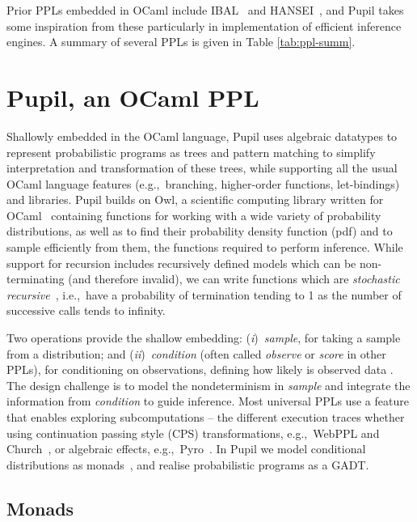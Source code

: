 \documentclass[sigconf]{acmart}
\newcommand{\one}{({\em i})\/}
\newcommand{\two}{({\em ii})\/}
\newcommand{\pupil}{Pupil\xspace}
\begin{document}
Prior PPLs embedded in OCaml include IBAL~\cite{ibal} and HANSEI~\cite{kiselyov2009embedded}, and \pupil takes some inspiration from these particularly in implementation of efficient inference engines. A summary of several PPLs is given in Table \ref{tab:ppl-summ}.

\section{\pupil, an OCaml PPL}
\label{s:pupil}

Shallowly embedded in the OCaml language, \pupil uses algebraic datatypes to represent probabilistic programs as trees and pattern matching to simplify interpretation and transformation of these trees, while supporting all the usual OCaml language features (e.g.,~branching, higher-order functions, let-bindings) and libraries. \pupil builds on Owl, a scientific computing library written for OCaml~\cite{owl} containing functions for working with a wide variety of probability distributions, as well as to find their probability density function (pdf) and to sample efficiently from them, the functions required to perform inference. While support for recursion includes  recursively defined models which can be non-terminating (and therefore invalid), we can write functions which are \textit{stochastic recursive}~\cite{siegmund}, i.e.,~have a probability of termination tending to 1 as the number of successive calls tends to infinity.

Two operations provide the shallow embedding: \one~\emph{sample}, for taking a sample from a distribution; and \two~\emph{condition} (often called \emph{observe} or \emph{score} in other PPLs), for conditioning on observations, defining how likely is observed data . The design challenge is to model the nondeterminism in \emph{sample} and integrate the information from \emph{condition} to guide inference. Most universal PPLs use a feature that enables exploring subcomputations -- the different execution traces whether using continuation passing style (CPS) transformations, e.g.,~WebPPL and Church~\cite{mobus2018structure,goodman2012church}, or algebraic effects, e.g.,~Pyro~\cite{bingham2019pyro}. In \pupil we model conditional distributions as monads~\cite{scibior2015practical}, and realise probabilistic programs as a GADT.

\subsection{Monads}
\end{document}
